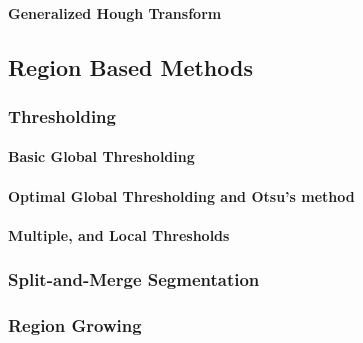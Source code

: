 \paragraph{Generalized Hough Transform } 
\label{booksection_67_Generalized_Hough_Transform_}

\subsection{Region Based Methods} 
\label{booksection_68_Region_Based_Methods}
\subsubsection{Thresholding} 
\label{booksection_69_Thresholding}
\paragraph{Basic Global Thresholding} 
\label{booksection_70_Basic_Global_Thresholding}

\paragraph{Optimal Global Thresholding and Otsu's method} 
\label{booksection_71_Optimal_Global_Thresholding_and_Otsus_method}

\paragraph{Multiple, and Local Thresholds} 
\label{booksection_72_Multiple_and_Local_Thresholds}

\subsubsection{Split-and-Merge Segmentation} 
\label{booksection_73_Split-and-Merge_Segmentation}

\subsubsection{Region Growing} 
\label{booksection_74_Region_Growing}

